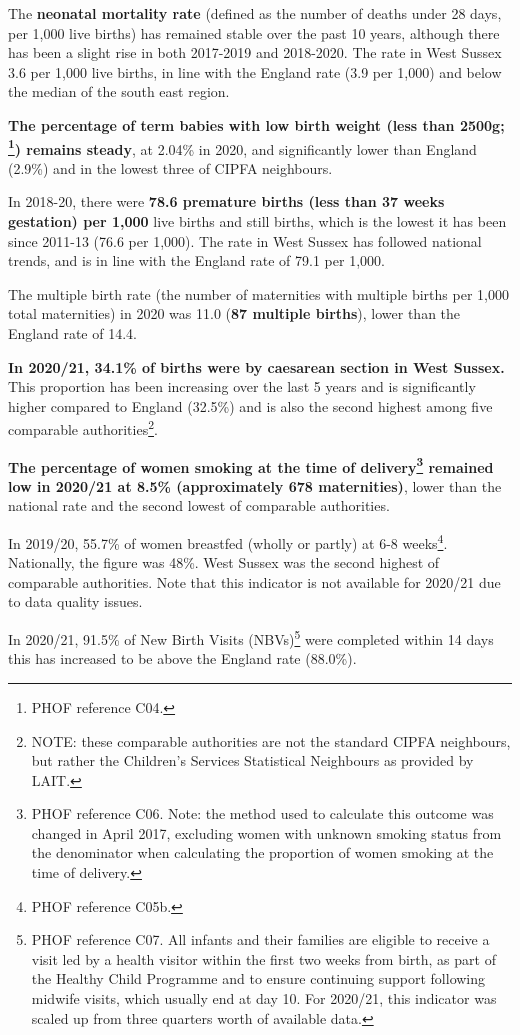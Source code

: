 The {\bfseries neonatal mortality rate} (defined as the number of deaths under 28 days, per 1,000 live births) has remained stable over the past 10 years, although there has been a slight rise in both 2017-2019 and 2018-2020. The rate in West Sussex 3.6 per 1,000 live births, in line with the England rate (3.9 per 1,000) and below the median of the south east region. 

{\bfseries The percentage of term babies with low birth weight (less than 2500g; \footnote{PHOF reference C04.}) remains steady}, at 2.04\% in 2020, and significantly lower than England (2.9\%) and in the lowest three of CIPFA neighbours.

In 2018-20, there were {\bfseries 78.6 premature births (less than 37 weeks gestation) per 1,000} live births and still births, which is the lowest it has been since 2011-13 (76.6 per 1,000). The rate in West Sussex has followed national trends, and is in line with the England rate of 79.1 per 1,000.

The multiple birth rate (the number of maternities with multiple births per 1,000 total maternities) in 2020 was 11.0 ({\bfseries 87 multiple births}), lower than the England rate of 14.4.

{\bfseries In 2020/21, 34.1\% of births were by caesarean section in West Sussex.} This proportion has been increasing over the last 5 years and is significantly higher compared to England (32.5\%) and is also the second highest among five comparable authorities\footnote{NOTE: these comparable authorities are not the standard CIPFA neighbours, but rather the Children's Services Statistical Neighbours as provided by LAIT.}.

{\bfseries The percentage of women smoking at the time of delivery\footnote{PHOF reference C06. Note: the method used to calculate this outcome was changed in April 2017, excluding women with unknown smoking status from the denominator when calculating the proportion of women smoking at the time of delivery.} remained low in 2020/21 at 8.5\% (approximately 678 maternities)}, lower than the national rate and the second lowest of comparable authorities.

In 2019/20, 55.7\% of women breastfed (wholly or partly) at 6-8 weeks\footnote{PHOF reference C05b.}. Nationally, the figure was 48\%. West Sussex was the second highest of comparable authorities. Note that this indicator is not available for 2020/21 due to data quality issues.

In 2020/21, 91.5\% of New Birth Visits (NBVs)\footnote{PHOF reference C07. All infants and their families are eligible to receive a visit led by a health visitor within the first two weeks from birth, as part of the Healthy Child Programme and to ensure continuing support following midwife visits, which usually end at day 10. For 2020/21, this indicator was scaled up from three quarters worth of available data.} were completed within 14 days this has increased to be above the England rate (88.0\%).

